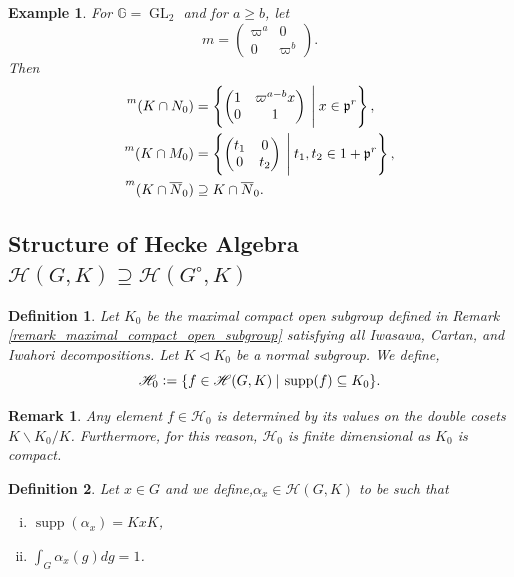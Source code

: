 \documentclass[8pt]{article}
\newtheorem{definition}{Definition}[section]
\newtheorem{remark}{Remark}[section]
\newtheorem{example}{Example}[section]
\DeclareMathOperator{\GL}{GL}
\DeclareMathOperator{\supp}{supp}
\newcommand{\defeq}{\vcentcolon=}
\newcommand{\G}[0]{\mathbb{G}}
\newcommand{\sep}[0]{\:|\:}
\newcommand{\hecke}[0]{\mathscr{H}}
\begin{document}
\begin{example}
  For $\G=\GL_2$ and for $a\geq b$, let
  \begin{equation*}
    m = \begin{pmatrix}
      \varpi^a & 0\\
      0&\varpi^b
    \end{pmatrix}.
  \end{equation*}
  Then 
  \begin{align*}
    \prescript{m}{}{(K\cap N_0)}&= \left\{\begin{pmatrix}
      1 & \varpi^{a-b}x\\
      0& 1
    \end{pmatrix}
    \:\Bigg{|}\: x\in\mathfrak{p}^r\right\},\\
     \prescript{m}{}{(K\cap M_0)}& = \left\{\begin{pmatrix}
      t_1 & 0\\
      0& t_2
    \end{pmatrix}
    \:\Bigg{|}\: t_1,t_2\in1+\mathfrak{p}^r\right\},\\
      \prescript{m}{}{(K\cap \overline{N}_0)}&\supseteq K\cap \overline{N}_0.
  \end{align*}
\end{example}

\subsection{Structure of Hecke Algebra $\hecke(G,K)\supseteq\hecke(G^\circ,K)$}

\begin{definition}
  Let $K_0$ be the maximal compact open subgroup defined in Remark \ref{remark_maximal_compact_open_subgroup} satisfying all Iwasawa, Cartan, and Iwahori decompositions.
  Let $K\triangleleft K_0$ be a normal subgroup. We define,
  \begin{equation*}
    \hecke_0\defeq\{f\in\hecke(G,K)\sep \supp(f)\subseteq K_0\}.
  \end{equation*}
\end{definition}

\begin{remark}
  Any element $f\in\hecke_0$ is determined by its values on the double cosets $K\backslash K_0/ K$. Furthermore, for this reason, $\hecke_0$ is finite dimensional as $K_0$ is compact.
\end{remark}

\begin{definition}
  Let $x\in G$ and we define,$\alpha_x\in\hecke(G,K)$ to be such that
  \begin{enumerate}[i).]
    \item $\supp(\alpha_x)=KxK$,
    \item $\int_G\alpha_x(g)dg = 1$.
  \end{enumerate}
\end{definition}
\end{document}
